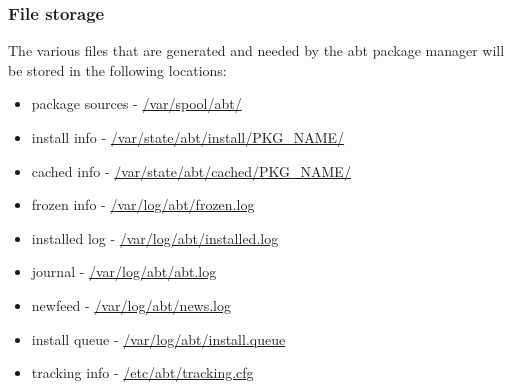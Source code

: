 \subsubsection{File storage}
The various files that are generated and needed by the abt package manager will be stored in the following locations:

\begin{itemize}
  \item package sources - \url{/var/spool/abt/}
  \item install info - \url{/var/state/abt/install/PKG_NAME/}
  \item cached info - \url{/var/state/abt/cached/PKG_NAME/}
  \item frozen info - \url{/var/log/abt/frozen.log}
  \item installed log - \url{/var/log/abt/installed.log}
  \item journal - \url{/var/log/abt/abt.log}
  \item newfeed - \url{/var/log/abt/news.log}
  \item install queue - \url{/var/log/abt/install.queue}
  \item tracking info - \url{/etc/abt/tracking.cfg}
\end{itemize}
